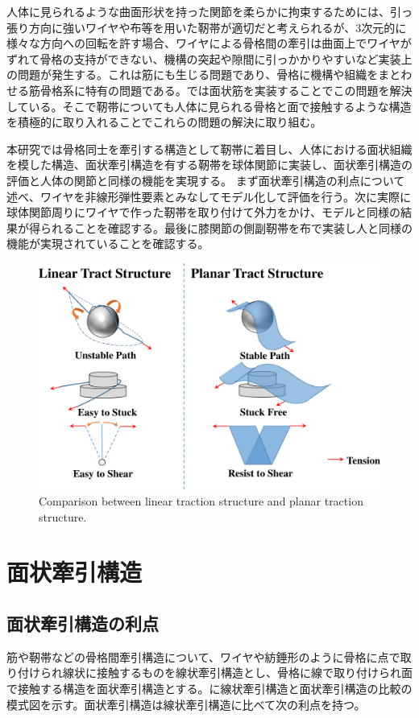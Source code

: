 \documentclass{jarticle}
\begin{document}
人体に見られるような曲面形状を持った関節を柔らかに拘束するためには、引っ張り方向に強いワイヤや布等を用いた靭帯が適切だと考えられるが、3次元的に様々な方向への回転を許す場合、ワイヤによる骨格間の牽引は曲面上でワイヤがずれて骨格の支持ができない、機構の突起や隙間に引っかかりやすいなど実装上の問題が発生する。これは筋にも生じる問題であり、骨格に機構や組織をまとわせる筋骨格系に特有の問題である。\cite{Humanoids2011:osada:planar}では面状筋を実装することでこの問題を解決している。そこで靭帯についても人体に見られる骨格と面で接触するような構造を積極的に取り入れることでこれらの問題の解決に取り組む。

本研究では骨格同士を牽引する構造として靭帯に着目し、人体における面状組織を模した構造、面状牽引構造を有する靭帯を球体関節に実装し、面状牽引構造の評価と人体の関節と同様の機能を実現する。
まず面状牽引構造の利点について述べ、ワイヤを非線形弾性要素とみなしてモデル化して評価を行う。次に実際に球体関節周りにワイヤで作った靭帯を取り付けて外力をかけ、モデルと同様の結果が得られることを確認する。最後に膝関節の側副靭帯を布で実装し人と同様の機能が実現されていることを確認する。

\begin{figure}[!t]
 \centering
  \includegraphics[width=1.0\columnwidth]{figs/schematic-comparison-of-structure.pdf}
  \vspace*{-4mm}
  \caption{Comparison between linear traction structure and planar traction structure.}
  \label{fig:schema}
\end{figure}

\section{面状牽引構造}
\subsection{面状牽引構造の利点}
筋や靭帯などの骨格間牽引構造について、ワイヤや紡錘形のように骨格に点で取り付けられ線状に接触するものを線状牽引構造とし、骨格に線で取り付けられ面で接触する構造を面状牽引構造とする。に線状牽引構造と面状牽引構造の比較の模式図を示す。面状牽引構造は線状牽引構造に比べて次の利点を持つ。
\end{document}
